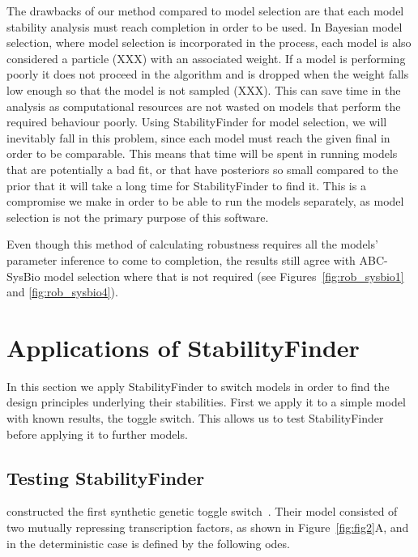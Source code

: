{The drawbacks of our method compared to model selection are that each model stability analysis must reach completion in order to be used. In Bayesian model selection, where model selection is incorporated in the process, each model is also considered a particle (XXX) with an associated weight. If a model is performing poorly it does not proceed in the algorithm and is dropped when the weight falls low enough so that the model is not sampled (XXX). This can save time in the analysis as computational resources are not wasted on models that perform the required behaviour poorly. Using StabilityFinder for model selection, we will inevitably fall in this problem, since each model must reach the given final \textepsilon{} in order to be comparable. This means that time will be spent in running models that are potentially a bad fit, or that have posteriors so small compared to the prior that it will take a long time for StabilityFinder to find it. This is a compromise we make in order to be able to run the models separately, as model selection is not the primary purpose of this software. 

Even though this method of calculating robustness requires all the models' parameter inference to come to completion, the results still agree with ABC-SysBio model selection where that is not required (see Figures~\ref{fig:rob_sysbio1} and \ref{fig:rob_sysbio4}).


\section{Applications of StabilityFinder}

In this section we apply StabilityFinder to switch models in order to find the design principles underlying their stabilities. First we apply it to a simple model with known results, the \textcite{Gardner:2000vha} toggle switch. This allows us to test StabilityFinder before applying it to further models.

\subsection{Testing StabilityFinder}

\textcite{Gardner:2000vha} constructed the first synthetic genetic toggle switch~\autocite{Gardner:2000vha}. Their model consisted of two mutually repressing transcription factors, as shown in Figure~\ref{fig:fig2}A, and in the deterministic case is defined by the following \acrshort{ode}s.

}
